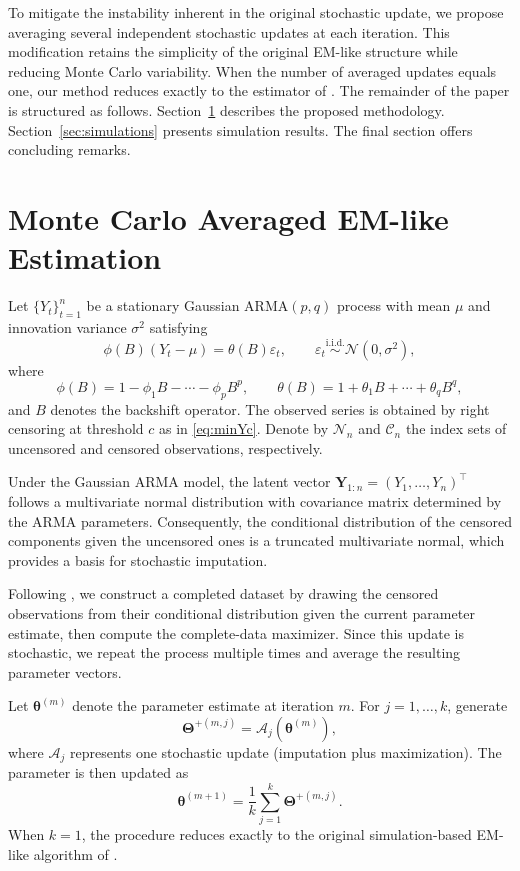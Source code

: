 \documentclass[twoside]{article}
\begin{document}
To mitigate the instability inherent in the original stochastic update, we propose averaging several independent stochastic updates at each iteration. This modification retains the simplicity of the original EM-like structure while reducing Monte Carlo variability. When the number of averaged updates equals one, our method reduces exactly to the estimator of \cite{park2007}. The remainder of the paper is structured as follows. Section~\ref{sec:method} describes the proposed methodology. Section~\ref{sec:simulations} presents simulation results. The final section offers concluding remarks.

\section{Monte Carlo Averaged EM-like Estimation}
\label{sec:method}
Let $\{Y_t\}_{t=1}^n$ be a stationary Gaussian ARMA$(p,q)$ process with mean $\mu$ and innovation variance $\sigma^2$ satisfying
\begin{equation*}
\phi(B)(Y_t-\mu)=\theta(B)\varepsilon_t,
\qquad
\varepsilon_t \stackrel{\text{i.i.d.}}{\sim} \mathcal{N}(0,\sigma^2),
\end{equation*}
where
\begin{equation*}
\phi(B)=1-\phi_1B-\cdots-\phi_pB^p,
\qquad
\theta(B)=1+\theta_1B+\cdots+\theta_qB^q,
\end{equation*}
and $B$ denotes the backshift operator. The observed series is obtained by right censoring at threshold $c$ as in \eqref{eq:minYc}. Denote by $\mathcal{N}_n$ and $\mathcal{C}_n$ the index sets of uncensored and censored observations, respectively.

Under the Gaussian ARMA model, the latent vector $\mathbf{Y}_{1:n} = (Y_1,\ldots,Y_n)^\top$ follows a multivariate normal distribution with covariance matrix determined by the ARMA parameters. Consequently, the conditional distribution of the censored components given the uncensored ones is a truncated multivariate normal, which provides a basis for stochastic imputation.

Following \citet{park2007}, we construct a completed dataset by drawing the censored observations from their conditional distribution given the current parameter estimate, then compute the complete-data maximizer. Since this update is stochastic, we repeat the process multiple times and average the resulting parameter vectors.

Let $\boldsymbol{\theta}^{(m)}$ denote the parameter estimate at iteration $m$. For $j=1,\ldots,k$, generate
\[
\boldsymbol{\Theta}^{+(m,j)} = \mathcal{A}_j(\boldsymbol{\theta}^{(m)}),
\]
where $\mathcal{A}_j$ represents one stochastic update (imputation plus maximization). The parameter is then updated as
\[
\boldsymbol{\theta}^{(m+1)} = \frac{1}{k}\sum_{j=1}^k \boldsymbol{\Theta}^{+(m,j)}.
\]
When $k=1$, the procedure reduces exactly to the original simulation-based EM-like algorithm of \citet{park2007}.
\end{document}
